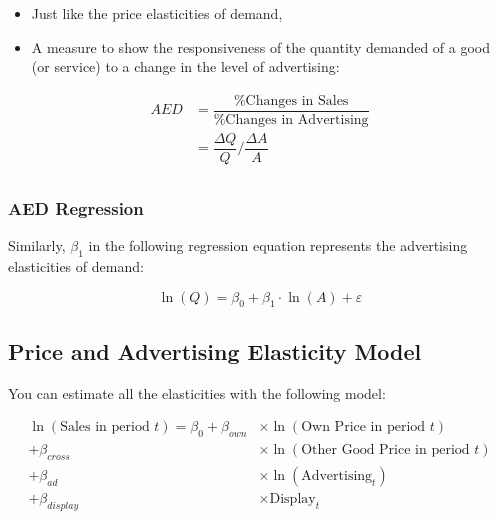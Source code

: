 \documentclass[10pt,article]{article}
\begin{document}
\begin{itemize}
\item Just like the price elasticities of demand,
\item A measure to show the responsiveness of the quantity demanded of a good (or
service) to a change in the level of advertising:
\end{itemize}

\begin{align*}
  AED  & = \dfrac{\% \text{Changes in Sales}}{\% \text{Changes in Advertising}} \\
        & = \dfrac {\Delta Q}{Q} \Bigg/ \dfrac {\Delta A}{A}  \\
\end{align*}
\subsubsection{AED Regression}
\label{sec:org8b3a096}
Similarly, \(\beta_1\) in the following regression equation represents
the advertising elasticities of demand:

\[  \ln(Q) =  \beta_0 + \beta_1 \cdot \ln(A) + \varepsilon \]
\subsection{Price and Advertising Elasticity Model}
\label{sec:orgd4dd1e2}
You can estimate all the elasticities with the following model:

\begin{align*}
\ln(\text{Sales in period } t) = \beta_0 + \beta_{own} & \times \ln(\text{Own Price in period } t) \\
                                         + \beta_{cross} & \times \ln(\text{Other Good Price in period } t) \\
                                         + \beta_{ad} & \times \ln (\text{Advertising}_t) \\
                                         + \beta_{display} & \times \text{Display}_t
\end{align*}
\iffalse
\begin{align*}
\ln(\text{Sales in period } t) = \beta_0 + \beta_{own} & \times \ln(\text{Own Price in period } t) \\
                                         + \beta_{cross} & \times \ln(\text{Other Good Price in period } t) \\
                                         + \beta_{ad} & \times \ln (\text{Advertising}_t) \\
                                         + \beta_{display} & \times \text{Display}_t
\end{align*}
\fi
\end{document}
